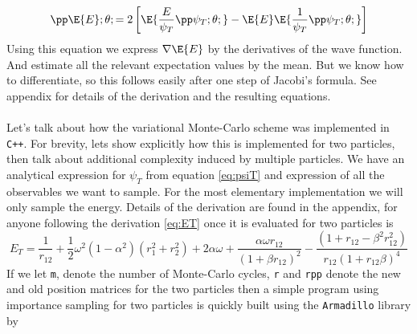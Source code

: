 \documentclass[11pt,english,a4paper]{article}
\begin{document}
\[
\pp \E{E};\theta; = 2 \left[ \E{\frac{E}{\psi_T} \pp \psi_T;\theta;} - \E{E} \E{\frac{1}{\psi_T} \pp \psi_T ; \theta; }  \right]
\]
Using this equation we express $\nabla \E{E}$ by the derivatives of the wave function. And estimate all the relevant expectation values by the mean. But we know how to differentiate, so this follows easily after one step of Jacobi's formula. See appendix for details of the derivation and the resulting equations.\\
\\
Let's talk about how the variational Monte-Carlo scheme was implemented in \texttt{C++}. For brevity, lets show explicitly how this is implemented for two particles, then talk about additional complexity induced by multiple particles. We have an analytical expression for $\psi_T$ from equation \eqref{eq:psiT} and expression of all the observables we want to sample. For the most elementary implementation we will only sample the energy. Details of the derivation are found in the appendix, for anyone following the derivation \eqref{eq:ET} once it is evaluated for two particles is
\[
E_T = \frac{1}{r_{12}} + \frac{1}{2}\omega^2(1-\alpha^2)( r_1^2 + r_2^2 )
            + 2\alpha\omega + \frac{\alpha\omega r_{12}}{(1 + \beta r_{12})^2} - \frac{(1+r_{12}-\beta^2r_{12}^2)}{ r_{12}(1 + r_{12}\beta)^4 }
\]
If we let \texttt{m}, denote the number of Monte-Carlo cycles, \texttt{r} and \texttt{rpp} denote the new and old position matrices for the two particles then a simple program using importance sampling for two particles is quickly built using the \texttt{Armadillo} library by\\
\end{document}
